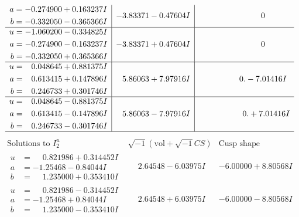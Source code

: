 \documentclass[1p]{elsarticle_modified}
\theoremstyle{definition}
\newcommand{\I}{\sqrt{-1}}
\begin{document}
$$\begin{array}{c|c|c}
\begin{aligned}
a &= -0.274900 + 0.163237 I \\
b &= -0.332050 - 0.365366 I\end{aligned}
 & -3.83371 - 0.47604 I & \phantom{-0.000000 } 0 \\ \hline\begin{aligned}
u &= -1.060200 - 0.334825 I \\
a &= -0.274900 - 0.163237 I \\
b &= -0.332050 + 0.365366 I\end{aligned}
 & -3.83371 + 0.47604 I & \phantom{-0.000000 } 0 \\ \hline\begin{aligned}
u &= \phantom{-}0.048645 + 0.881375 I \\
a &= \phantom{-}0.613415 + 0.147896 I \\
b &= \phantom{-}0.246733 + 0.301746 I\end{aligned}
 & \phantom{-}5.86063 + 7.97916 I & \phantom{-0.000000 } 0. - 7.01416 I \\ \hline\begin{aligned}
u &= \phantom{-}0.048645 - 0.881375 I \\
a &= \phantom{-}0.613415 - 0.147896 I \\
b &= \phantom{-}0.246733 - 0.301746 I\end{aligned}
 & \phantom{-}5.86063 - 7.97916 I & \phantom{-0.000000 -}0. + 7.01416 I\\
 \hline 
 \end{array}$$\newpage$$\begin{array}{c|c|c}  
\text{Solutions to }I^u_{2}& \I (\text{vol} + \sqrt{-1}CS) & \text{Cusp shape}\\
 \hline 
\begin{aligned}
u &= \phantom{-}0.821986 + 0.314452 I \\
a &= -1.25468 - 0.84044 I \\
b &= \phantom{-}1.235000 + 0.353410 I\end{aligned}
 & \phantom{-}2.64548 - 6.03975 I & -6.00000 + 8.80568 I \\ \hline\begin{aligned}
u &= \phantom{-}0.821986 - 0.314452 I \\
a &= -1.25468 + 0.84044 I \\
b &= \phantom{-}1.235000 - 0.353410 I\end{aligned}
 & \phantom{-}2.64548 + 6.03975 I & -6.00000 - 8.80568 I \\ \hline\begin{aligned}

\end{aligned}
\end{array}$$
\end{document}
